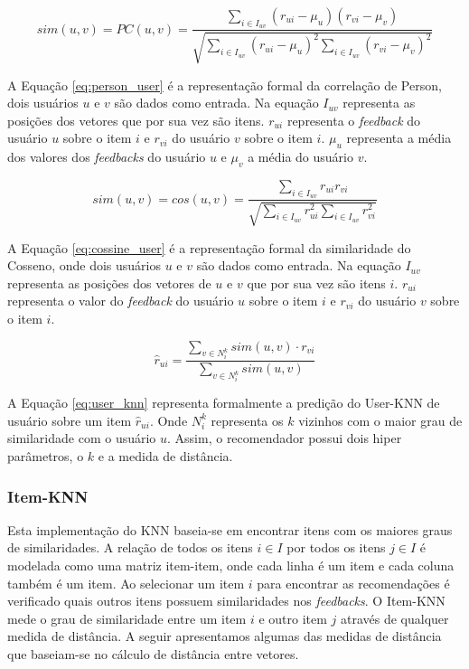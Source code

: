 \begin{equation}
    \label{eq:person_user}
    sim(u,v) = PC(u,v) = \frac{\sum_{i \in I_{uv}}(r_{ui} - \mu_u)(r_{vi} - \mu_v)}{\sqrt{\sum_{i \in I_{uv}}(r_{ui} - \mu_u)^2\sum_{i \in I_{uv}}(r_{vi} - \mu_v)^2}}
\end{equation}

A Equação \ref{eq:person_user} é a representação formal da correlação de Person, dois usuários $u$ e $v$ são dados como entrada. Na equação $I_{uv}$ representa as posições dos vetores que por sua vez são itens. $r_{ui}$ representa o \textit{feedback} do usuário $u$ sobre o item $i$ e $r_{vi}$ do usuário $v$ sobre o item $i$. $\mu_u$ representa a média dos valores dos \textit{feedbacks} do usuário $u$ e $\mu_v$ a média do usuário $v$.

\begin{equation}
    \label{eq:cossine_user}
    sim(u,v) = cos(u,v) = \frac{\sum_{i \in I_{uv}}r_{ui}r_{vi}}{\sqrt{\sum_{i \in I_{uv}}r_{ui}^2\sum_{i \in I_{uv}}r_{vi}^2}}
\end{equation}

A Equação \ref{eq:cossine_user} é a representação formal da similaridade do Cosseno, onde dois usuários $u$ e $v$ são dados como entrada. Na equação $I_{uv}$ representa as posições dos vetores de $u$ e $v$ que por sua vez são itens $i$. $r_{ui}$ representa o valor do \textit{feedback} do usuário $u$ sobre o item $i$ e $r_{vi}$ do usuário $v$ sobre o item $i$.

\begin{equation}
    \label{eq:user_knn}
    \hat{r}_{ui} = \frac{\sum_{v \in N_{i}^{k}} sim(u,v)\cdot r_{vi}}{\sum_{v \in N_{i}^{k}} sim(u,v)}
\end{equation}

A Equação \ref{eq:user_knn} representa formalmente a predição do User-KNN de usuário sobre um item $\hat{r}_{ui}$. Onde $N_{i}^{k}$ representa os $k$ vizinhos com o maior grau de similaridade com o usuário $u$. Assim, o recomendador possui dois hiper parâmetros, o $k$ e a medida de distância.

\subsubsection{Item-KNN} Esta implementação do \ac{KNN} baseia-se em encontrar itens com os maiores graus de similaridades. A relação de todos os itens $i \in I$ por todos os itens $j \in I$ é modelada como uma matriz item-item, onde cada linha é um item e cada coluna também é um item. Ao selecionar um item $i$ para encontrar as recomendações é verificado quais outros itens possuem similaridades nos \textit{feedbacks}. O Item-KNN mede o grau de similaridade entre um item $i$ e outro item $j$ através de qualquer medida de distância. A seguir apresentamos algumas das medidas de distância que baseiam-se no cálculo de distância entre vetores.

